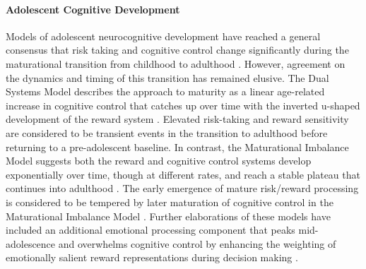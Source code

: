 \documentclass[utf8]{stylesheet}
\begin{document}
\paragraph*{Adolescent Cognitive Development} Models of adolescent neurocognitive development have reached a general consensus that risk taking and cognitive control change significantly during the maturational transition from childhood to adulthood \citep{Steinberg2010}. However, agreement on the dynamics and timing of this transition has remained elusive. The Dual Systems Model describes the approach to maturity as a linear age-related increase in cognitive control that catches up over time with the inverted u-shaped development of the reward system \citep{Steinberg2005}. Elevated risk-taking and reward sensitivity are considered to be transient events in the transition to adulthood before returning to a pre-adolescent baseline. In contrast, the Maturational Imbalance Model suggests both the reward and cognitive control systems develop exponentially over time, though at different rates, and reach a stable plateau that continues into adulthood \citep{CaseyEtAl2008}. The early emergence of mature risk/reward processing is considered to be tempered by later maturation of cognitive control in the Maturational Imbalance Model \citep{somerville2010developmental}. Further elaborations of these models have included an additional emotional processing component that peaks mid-adolescence and overwhelms cognitive control by enhancing the weighting of emotionally salient reward representations during decision making \citep{casey2019development}.
\vspace{4pt}
\end{document}
